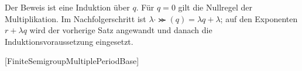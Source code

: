 \documentclass[main.tex]{subfiles}
\begin{document}
Der Beweis ist eine Induktion über \(q\).  Für \(q=0\) gilt die
Nullregel der Multiplikation.  Im Nachfolgerschritt ist
\(\lambda\cdot\Succ(q)=\lambda q+\lambda\); auf den Exponenten
\(r+\lambda q\) wird der vorherige Satz angewandt und danach die
Induktionsvoraussetzung eingesetzt.

\begin{tabproofsplitwide}
  [FiniteSemigroupMultiplePeriodBase]
  \closeproofpartwideindR


\end{tabproofsplitwide}
\end{document}
